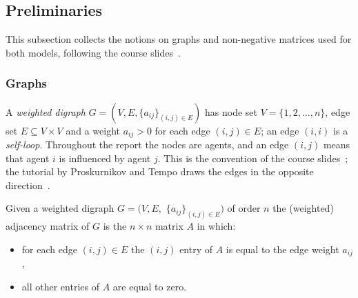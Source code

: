 \subsection{Preliminaries}
\label{subsec:prelim}

This subsection collects the notions on graphs and non-negative matrices used for both
models, following the course slides~\cite{baggio_graph,baggio_matrix,baggio_dt}.

\subsubsection{Graphs}
\label{subsubsec:prelim-graphs}

A \emph{weighted digraph} $G = (V, E, \{a_{ij}\}_{(i,j) \in E})$ has node set
$V = \{1, 2, \dots, n\}$, edge set $E \subseteq V \times V$ and a weight $a_{ij} > 0$ for
each edge $(i,j) \in E$; an edge $(i,i)$ is a \emph{self-loop}. Throughout the report
the nodes are agents, and an edge $(i,j)$ means that agent $i$ is influenced by agent
$j$. This is the convention of the course slides~\cite{baggio_dt}; the tutorial by
Proskurnikov and Tempo draws the edges in the opposite
direction~\cite{proskurnikov2017tutorial}.

\begin{definition}
\label{def:adjacency}
Given a weighted digraph $G = (V, E,$ $\{a_{ij}\}_{(i,j) \in E})$ of order $n$ the
(weighted) adjacency matrix of $G$ is the $n \times n$ matrix $A$ in which:
\begin{itemize}
  \item[(i)] for each edge $(i,j) \in E$ the $(i,j)$ entry of $A$ is equal to the edge
             weight $a_{ij}$,
  \item[(ii)] all other entries of $A$ are equal to zero.
\end{itemize}
\end{definition}

